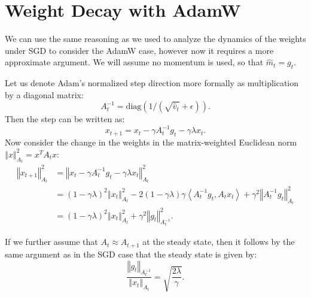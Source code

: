 \documentclass[]{fairmeta}
\begin{document}

\section{Weight Decay with AdamW}
\label{sec:adamw}
We can use the same reasoning as we used to analyze the dynamics of
the weights under SGD to consider the AdamW case, however now it requires
a more approximate argument. We will assume no momentum is used, so
that $\hat{m}_{t}=g_{t}$. 

Let us denote Adam's normalized step direction more formally as multiplication
by a diagonal matrix:
\[
A_{t}^{-1}=\text{diag}\left(1/\left(\sqrt{\hat{v}_{t}}+\epsilon\right)\right).
\]
Then the step can be written as:
\[
x_{t+1}=x_{t}-\gamma A_{t}^{-1}g_{t}-\gamma\lambda x_{t}.
\]
Now consider the change in the weights in the matrix-weighted Euclidean
norm $\left\Vert x\right\Vert _{A_{t}}^{2}=x^{T}A_{t}x$:
\begin{align*}
\left\Vert x_{t+1}\right\Vert _{A_{t}}^{2} & =\left\Vert x_{t}-\gamma A_{t}^{-1}g_{t}-\gamma \lambda x_{t}\right\Vert _{A_{t}}^{2}\\
 & =\left(1-\gamma \lambda\right)^{2}\left\Vert x_{t}\right\Vert _{A_{t}}^{2}-2\left(1-\gamma\lambda\right)\gamma\left\langle A_{t}^{-1}g_{t},A_{t}x_{t}\right\rangle 
 + \gamma^{2}\left\Vert A_{t}^{-1}g_{t}\right\Vert _{A_{t}}^{2}\\
 & =\left(1-\gamma \lambda\right)^{2}\left\Vert x_{t}\right\Vert _{A_{t}}^{2}+\gamma^{2}\left\Vert g_{t}\right\Vert _{A_{t}^{-1}}^{2}.
\end{align*}

If we further assume that $A_{t} \approx A_{t+1}$ at the steady state, then
it follows by the same argument as in the SGD case that the steady
state is given by:
\[
\frac{\left\Vert g_{t}\right\Vert _{A_{t}^{-1}}}{\left\Vert x_{t}\right\Vert _{A_{t}}}=\sqrt{\frac{2\lambda}{\gamma}}.
\]
\end{document}
